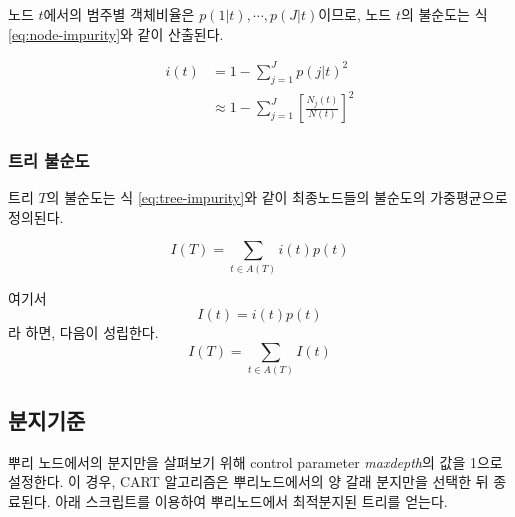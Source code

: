 \documentclass[
]{book}
\begin{document}
노드 \(t\)에서의 범주별 객체비율은 \(p(1|t), \cdots, p(J|t)\)이므로, 노드 \(t\)의 불순도는 식 \eqref{eq:node-impurity}와 같이 산출된다.

\begin{equation}
\begin{split}
i(t) &= 1 - \sum_{j=1}^{J} p(j|t)^2\\
&\approx 1 - \sum_{j=1}^{J} \left[\frac{N_j(t)}{N(t)}\right]^2
\end{split}
\label{eq:node-impurity}
\end{equation}

\hypertarget{uxd2b8uxb9ac-uxbd88uxc21cuxb3c4}{%
\subsubsection{트리 불순도}\label{uxd2b8uxb9ac-uxbd88uxc21cuxb3c4}}

트리 \(T\)의 불순도는 식 \eqref{eq:tree-impurity}와 같이 최종노드들의 불순도의 가중평균으로 정의된다.

\begin{equation}
I(T) = \sum_{t \in A(T)} i(t)p(t) \label{eq:tree-impurity}
\end{equation}

여기서
\[ I(t) = i(t)p(t) \]
라 하면, 다음이 성립한다.
\[ I(T) = \sum_{t \in A(T)} I(t) \]

\hypertarget{cart-split}{%
\subsection{분지기준}\label{cart-split}}

뿌리 노드에서의 분지만을 살펴보기 위해 control parameter \emph{maxdepth}의 값을 1으로 설정한다. 이 경우, CART 알고리즘은 뿌리노드에서의 양 갈래 분지만을 선택한 뒤 종료된다. 아래 스크립트를 이용하여 뿌리노드에서 최적분지된 트리를 얻는다.
\end{document}
